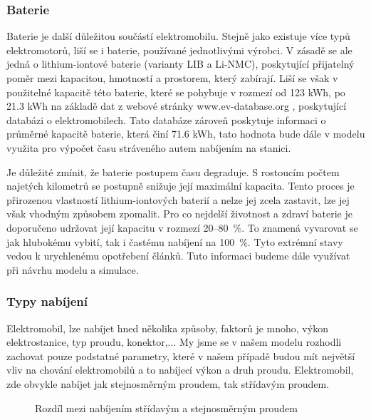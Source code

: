 \documentclass[a4paper,11pt]{article}
\begin{document}
\subsubsection{Baterie}

\label{batteries}
Baterie je další důležitou součástí elektromobilu. Stejně jako existuje více typů elektromotorů, 
liší se i baterie, používané jednotlivými výrobci. V zásadě se ale jedná o lithium-iontové baterie
(varianty LIB a Li-NMC), poskytující přijatelný poměr mezi kapacitou, hmotností a prostorem, který 
zabírají.\cite{baterie_ev_wiki} Liší se však v použitelné kapacitě této baterie, které se pohybuje 
v rozmezí od 123 kWh, po 21.3 kWh na základě dat z webové stránky www.ev-database.org \cite{ev_database}, 
poskytující databázi o elektromobilech. Tato databáze zároveň poskytuje informaci o průměrné kapacitě
baterie, která činí 71.6 kWh, tato hodnota bude dále v modelu využita pro výpočet času stráveného autem
nabíjením na stanici.

Je důležité zmínit, že baterie postupem času degraduje. S rostoucím počtem najetých kilometrů se postupně snižuje její maximální kapacita. Tento proces je přirozenou vlastností lithium-iontových baterií a nelze jej zcela zastavit, lze jej však vhodným způsobem zpomalit. Pro co nejdelší životnost a zdraví baterie je doporučeno udržovat její kapacitu v rozmezí 20–80~\%. To znamená vyvarovat se jak hlubokému vybití, tak i častému nabíjení na 100~\%. Tyto extrémní stavy vedou k urychlenému opotřebení článků. Tuto informaci budeme dále využívat při návrhu modelu a simulace.\cite{battery-health}

\subsubsection{Typy nabíjení}
Elektromobil, lze nabíjet hned několika způsoby, faktorů je mnoho, výkon elektrostanice, typ proudu, 
konektor,... My jsme se v našem modelu rozhodli zachovat pouze podstatné parametry, které v našem 
případě budou mít největší vliv na chování elektromobilů a to nabíjecí výkon a druh proudu. 
Elektromobil, zde obvykle nabíjet jak stejnosměrným proudem, tak střídavým proudem.

\begin{figure}[H]
    \centering
    \caption{Rozdíl mezi nabíjením střídavým a stejnosměrným proudem \cite{rozdil_mezi_ac_dc_nabijenim}}
    \label{figure:difference-between-ac-and-cd-charging-ev}
\end{figure}
\end{document}
